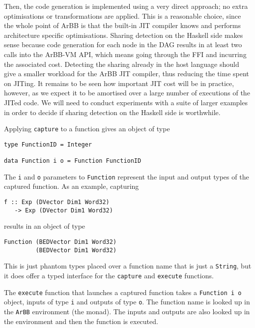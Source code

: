 Then, the code generation is implemented using a very 
direct approach; no extra optimisations or transformations are applied. 
This is a reasonable choice, since the whole point of ArBB is that the 
built-in JIT compiler knows and performs architecture specific optimisations. 
Sharing detection on the Haskell side makes sense because code generation for 
each node in the DAG results in at least two calls into the ArBB-VM API, which 
means going through the FFI and incurring the associated cost. Detecting the
sharing already in the host language should give a smaller workload for the 
ArBB JIT compiler, thus reducing the time spent on JITing.
It remains to be seen how important JIT cost will be in practice, however,
as we expect it to be amortised over a large number of executions of 
the JITed code. We will need to conduct experiments with a suite of larger 
examples in order to decide if sharing detection on the Haskell side is 
worthwhile.


Applying {\tt capture} to a function gives an object of type

\begin{verbatim}
type FunctionID = Integer

data Function i o = Function FunctionID
\end{verbatim}

The {\tt i} and {\tt o} parameters to {\tt Function} represent the input and output 
types of the captured function. As an example, capturing 
\begin{verbatim}
f :: Exp (DVector Dim1 Word32) 
   -> Exp (DVector Dim1 Word32)
\end{verbatim}
results in an object of type
\begin{verbatim}
Function (BEDVector Dim1 Word32) 
         (BEDVector Dim1 Word32)
\end{verbatim}
This is just phantom types placed over a function name that is just a {\tt String},
but it does offer a typed interface for the {\tt capture} and {\tt execute} functions.

The {\tt execute} function that launches a captured function takes a {\tt Function i o} 
object, inputs of type {\tt i} and outputs of type {\tt o}.
The function name is looked up in the {\tt ArBB} environment (the monad). The inputs
and outputs are also looked up in the environment and then the function 
is executed. 

